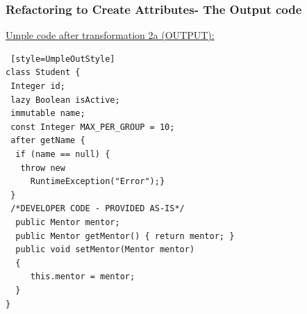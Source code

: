 \documentclass[xcolor=table]{beamer}
\begin{document}


\begin{frame}[fragile] %
\frametitle{Refactoring to Create Attributes- The Output code}
\underline{Umple code after transformation 2a (OUTPUT): }
\begin{lstlisting} [style=UmpleOutStyle]
class Student { 
 Integer id;
 lazy Boolean isActive;  
 immutable name;
 const Integer MAX_PER_GROUP = 10;
 after getName { 
  if (name == null) { 
   throw new 
     RuntimeException("Error");}
 }
 /*DEVELOPER CODE - PROVIDED AS-IS*/
  public Mentor mentor; 
  public Mentor getMentor() { return mentor; } 
  public void setMentor(Mentor mentor)
  { 
     this.mentor = mentor; 
  } 
}

\end{lstlisting}
\end{frame}
\end{document}

